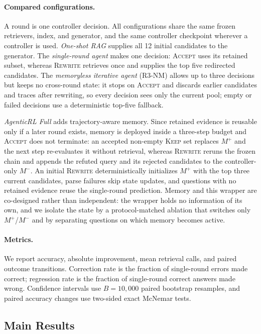 \paragraph{Compared configurations.}
A round is one controller decision. All configurations share the same frozen
retrievers, index, and generator, and the same controller checkpoint wherever a
controller is used. \emph{One-shot RAG} supplies all 12 initial candidates to
the generator. The \emph{single-round agent} makes one decision: \textsc{Accept}
uses its retained subset, whereas \textsc{Rewrite} retrieves once and supplies
the top five redirected candidates. The \emph{memoryless iterative agent}
(R3-NM) allows up to three decisions but keeps no cross-round state: it stops on
\textsc{Accept} and discards earlier candidates and traces after rewriting, so
every decision sees only the current pool; empty or failed decisions use a
deterministic top-five fallback.

\emph{AgenticRL Full} adds trajectory-aware memory. Since retained evidence is
reusable only if a later round exists, memory is deployed inside a three-step
budget and \textsc{Accept} does not terminate: an accepted non-empty
\textsc{Keep} set replaces $M^+$ and the next step re-evaluates it without
retrieval, whereas \textsc{Rewrite} reruns the frozen chain and appends the
refuted query and its rejected candidates to the controller-only $M^-$. An
initial \textsc{Rewrite} deterministically initializes $M^+$ with the top three
current candidates, parse failures skip state updates, and questions with no
retained evidence reuse the single-round prediction. Memory and this wrapper are
co-designed rather than independent: the wrapper holds no information of its
own, and we isolate the state by a protocol-matched ablation that switches only
$M^+$/$M^-$ and by separating questions on which memory becomes active.

\paragraph{Metrics.}
We report accuracy, absolute improvement, mean retrieval calls, and paired
outcome transitions. Correction rate is the fraction of single-round errors
made correct; regression rate is the fraction of single-round correct answers
made wrong. Confidence intervals use $B=10{,}000$ paired bootstrap resamples,
and paired accuracy changes use two-sided exact McNemar tests.

\subsection{Main Results}
\label{sec:main-results}

